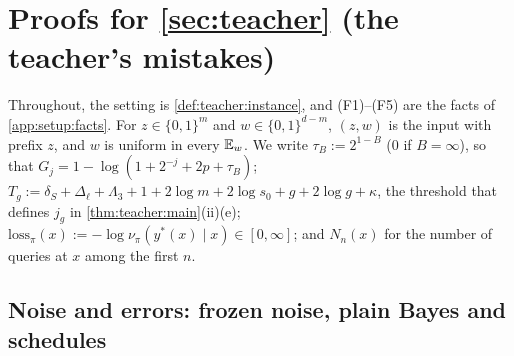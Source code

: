 \section{Proofs for \texorpdfstring{\cref{sec:teacher}}{Section \ref*{sec:teacher}} (the teacher's mistakes)}\label{app:teacher}

Throughout, the setting is \cref{def:teacher:instance}, and (F1)--(F5) are the facts of \cref{app:setup:facts}. For $z\in\{0,1\}^m$ and $w\in\{0,1\}^{d-m}$, $(z,w)$ is the input with prefix $z$, and $w$ is uniform in every $\mathbb{E}_w$. We write $\tau_B:=2^{1-B}$ ($0$ if $B=\infty$), so that $G_j=1-\log(1+2^{-j}+2p+\tau_B)$; $T_g:=\delta_S+\Delta_\ell+\Lambda_3+1+2\log m+2\log s_0+g+2\log g+\kappa$, the threshold that defines $j_g$ in \cref{thm:teacher:main}(ii)(e); $\mathrm{loss}_\pi(x):=-\log\nu_\pi(y^*(x)\mid x)\in[0,\infty]$; and $N_n(x)$ for the number of queries at $x$ among the first $n$.

\subsection{Noise and errors: frozen noise, plain Bayes and schedules}\label{app:teacher:schedules}


